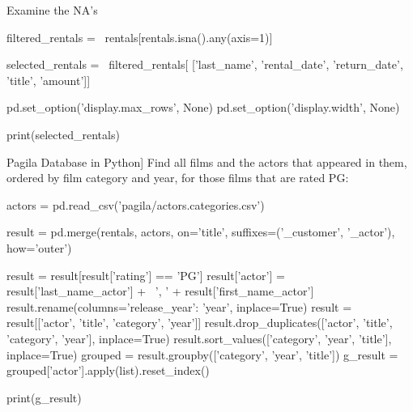 \documentclass[ignorenonframetext,xcolor=x11names]{beamer}
\begin{document}
\begin{frame}[fragile]{Examine the NA's}
\footnotesize
\begin{pythoncode}
filtered_rentals = \
    rentals[rentals.isna().any(axis=1)]

selected_rentals = \
    filtered_rentals[
        ['last_name', 'rental_date', 
         'return_date', 'title', 'amount']]

pd.set_option('display.max_rows', None)
pd.set_option('display.width', None)

print(selected_rentals)
\end{pythoncode}
\end{frame}

\begin{frame}[fragile]{Pagila Database in Python]}
Find all films and the actors that appeared in them, ordered by film category and year, for those films that are rated PG:

\scriptsize
\begin{pythoncode}
actors = pd.read_csv('pagila/actors.categories.csv')

result = pd.merge(rentals, actors, on='title', 
          suffixes=('_customer', '_actor'), 
          how='outer')

result = result[result['rating'] == 'PG']
result['actor'] = result['last_name_actor'] + \
          ', ' + result['first_name_actor']
result.rename(columns={'release_year': 'year'}, 
          inplace=True)
result = result[['actor', 'title', 'category', 'year']]
result.drop_duplicates(['actor', 'title', 'category', 'year'], 
          inplace=True)
result.sort_values(['category', 'year', 'title'], 
          inplace=True)
grouped = result.groupby(['category', 'year', 'title'])
g_result = grouped['actor'].apply(list).reset_index()

print(g_result)
\end{pythoncode}
\end{frame}
\end{document}
